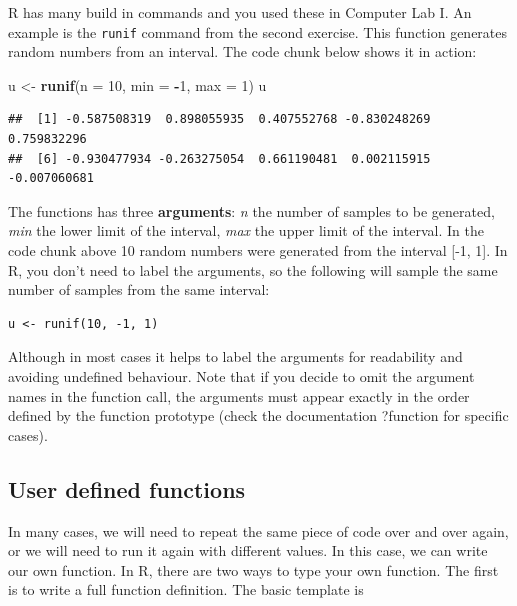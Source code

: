 \documentclass[
]{book}
\newenvironment{Shaded}{\begin{snugshade}}{\end{snugshade}}
\newcommand{\AttributeTok}[1]{\textcolor[rgb]{0.13,0.29,0.53}{#1}}
\newcommand{\DecValTok}[1]{\textcolor[rgb]{0.00,0.00,0.81}{#1}}
\newcommand{\FunctionTok}[1]{\textcolor[rgb]{0.13,0.29,0.53}{\textbf{#1}}}
\newcommand{\NormalTok}[1]{#1}
\newcommand{\OtherTok}[1]{\textcolor[rgb]{0.56,0.35,0.01}{#1}}
\newcommand{\SpecialCharTok}[1]{\textcolor[rgb]{0.81,0.36,0.00}{\textbf{#1}}}
\theoremstyle{definition}
\theoremstyle{definition}
\theoremstyle{definition}
\theoremstyle{definition}
\theoremstyle{remark}
\begin{document}
R has many build in commands and you used these in Computer Lab I. An example is the \texttt{runif} command from the second exercise. This function generates random numbers from an interval. The code chunk below shows it in action:

\begin{Shaded}
\begin{Highlighting}[]
\NormalTok{u }\OtherTok{\textless{}{-}} \FunctionTok{runif}\NormalTok{(}\AttributeTok{n =} \DecValTok{10}\NormalTok{, }\AttributeTok{min =} \SpecialCharTok{{-}}\DecValTok{1}\NormalTok{, }\AttributeTok{max =} \DecValTok{1}\NormalTok{)}
\NormalTok{u}
\end{Highlighting}
\end{Shaded}

\begin{verbatim}
##  [1] -0.587508319  0.898055935  0.407552768 -0.830248269  0.759832296
##  [6] -0.930477934 -0.263275054  0.661190481  0.002115915 -0.007060681
\end{verbatim}

The functions has three \textbf{arguments}: \emph{n} the number of samples to be generated, \emph{min} the lower limit of the interval, \emph{max} the upper limit of the interval. In the code chunk above 10 random numbers were generated from the interval {[}-1, 1{]}. In R, you don't need to label the arguments, so the following will sample the same number of samples from the same interval:

\begin{verbatim}
u <- runif(10, -1, 1)
\end{verbatim}

Although in most cases it helps to label the arguments for readability and avoiding undefined behaviour. Note that if you decide to omit the argument names in the function call, the arguments must appear exactly in the order defined by the function prototype (check the documentation ?function for specific cases).

\subsection{User defined functions}\label{user-defined-functions}

In many cases, we will need to repeat the same piece of code over and over again, or we will need to run it again with different values. In this case, we can write our own function. In R, there are two ways to type your own function. The first is to write a full function definition. The basic template is
\end{document}
